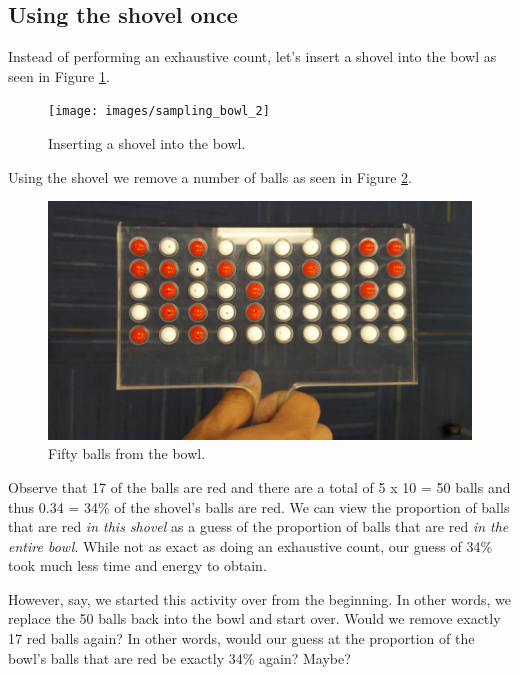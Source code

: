 \documentclass[12pt, krantz2,]{krantz}
\begin{document}
\hypertarget{using-the-shovel-once}{%
\subsection{Using the shovel once}\label{using-the-shovel-once}}

Instead of performing an exhaustive count, let's insert a shovel into the bowl as seen in Figure \ref{fig:sampling-exercise-2}.

\begin{figure}

{\centering \texttt{[image: images/sampling\_bowl\_2]} 

}

\caption{Inserting a shovel into the bowl.}\label{fig:sampling-exercise-2}
\end{figure}

Using the shovel we remove a number of balls as seen in Figure \ref{fig:sampling-exercise-3}.

\begin{figure}

{\centering \includegraphics[width=0.8\linewidth]{images/sampling_bowl_3_cropped} 

}

\caption{Fifty balls from the bowl.}\label{fig:sampling-exercise-3}
\end{figure}

Observe that 17 of the balls are red and there are a total of 5 x 10 = 50 balls and thus 0.34 = 34\% of the shovel's balls are red. We can view the proportion of balls that are red \emph{in this shovel} as a guess of the proportion of balls that are red \emph{in the entire bowl}. While not as exact as doing an exhaustive count, our guess of 34\% took much less time and energy to obtain.

However, say, we started this activity over from the beginning. In other words, we replace the 50 balls back into the bowl and start over. Would we remove exactly 17 red balls again? In other words, would our guess at the proportion of the bowl's balls that are red be exactly 34\% again? Maybe?
\end{document}
